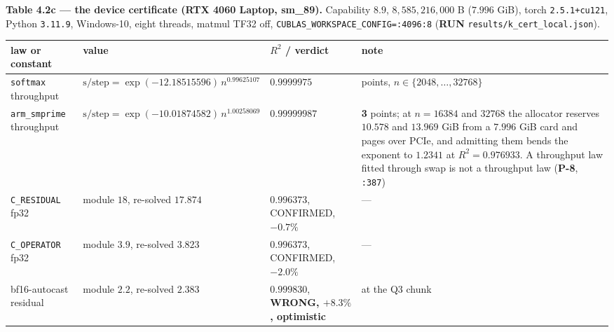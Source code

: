 \documentclass[11pt,a4paper]{article}
\newcounter{none}                 %
\theoremstyle{plain}
\theoremstyle{definition}
\theoremstyle{remark}
\begin{document}
\textbf{Table 4.2c --- the device certificate (RTX 4060 Laptop,
sm\_89).} Capability \(8.9\), \(8{,}585{,}216{,}000\) B (\(7.996\) GiB),
torch \texttt{2.5.1+cu121}, Python \texttt{3.11.9}, Windows-10, eight
threads, matmul TF32 off, \texttt{CUBLAS\_WORKSPACE\_CONFIG=:4096:8}
(\textbf{RUN} \texttt{results/k\_cert\_local.json}).

{\def\LTcaptype{none} %
\begin{longtable}[]{@{}
  >{\raggedright\arraybackslash}p{}
  >{\raggedright\arraybackslash}p{}
  >{\raggedright\arraybackslash}p{}
  >{\raggedright\arraybackslash}p{}@{}}
\toprule\noalign{}
\begin{minipage}[b]{\linewidth}\raggedright
law or constant
\end{minipage} & \begin{minipage}[b]{\linewidth}\raggedright
value
\end{minipage} & \begin{minipage}[b]{\linewidth}\raggedright
\(R^{2}\) / verdict
\end{minipage} & \begin{minipage}[b]{\linewidth}\raggedright
note
\end{minipage} \\
\midrule\noalign{}
\endhead
\bottomrule\noalign{}
\endlastfoot
\texttt{softmax} throughput &
\(\mathrm{s/step}=\exp(-12.18515596)\,n^{0.99625107}\) & \(0.9999975\) &
5 points, \(n\in\{2048,\dots,32768\}\) \\
\texttt{arm\_smprime} throughput &
\(\mathrm{s/step}=\exp(-10.01874582)\,n^{1.00258069}\) & \(0.99999987\)
& \textbf{3} points; at \(n=16384\) and \(32768\) the allocator reserves
\(10.578\) and \(13.969\) GiB from a \(7.996\) GiB card and pages over
PCIe, and admitting them bends the exponent to \(1.2341\) at
\(R^{2}=0.976933\). A throughput law fitted through swap is not a
throughput law (\textbf{P-8}, \texttt{:387}) \\
\texttt{C\_RESIDUAL} fp32 & module \(18\), re-solved \(17.874\) &
\(0.996373\), CONFIRMED, \(-0.7\%\) & --- \\
\texttt{C\_OPERATOR} fp32 & module \(3.9\), re-solved \(3.823\) &
\(0.996373\), CONFIRMED, \(-2.0\%\) & --- \\
bf16-autocast residual & module \(2.2\), re-solved \(2.383\) &
\(0.999830\), \textbf{WRONG, \(+8.3\%\), optimistic} & at the Q3 chunk

\end{longtable}}
\end{document}
